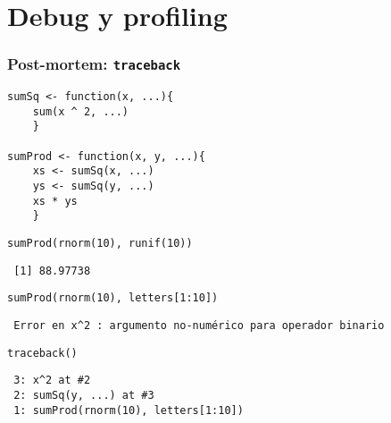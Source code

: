\documentclass[xcolor={usenames,svgnames,dvipsnames}]{beamer}
\begin{document}
\section{Debug y profiling}
\label{sec-3}
\begin{frame}[fragile]
\frametitle{Post-mortem: \texttt{traceback}}
\label{sec-3-1}


\lstset{language=R}
\begin{lstlisting}
sumSq <- function(x, ...){
    sum(x ^ 2, ...)
    }

sumProd <- function(x, y, ...){
    xs <- sumSq(x, ...)
    ys <- sumSq(y, ...)
    xs * ys
    }
\end{lstlisting}



\lstset{language=R}
\begin{lstlisting}
sumProd(rnorm(10), runif(10))
\end{lstlisting}

\begin{verbatim}
 [1] 88.97738
\end{verbatim}


\lstset{language=R}
\begin{lstlisting}
sumProd(rnorm(10), letters[1:10])
\end{lstlisting}

\begin{verbatim}
 Error en x^2 : argumento no-numérico para operador binario
\end{verbatim}


\lstset{language=R}
\begin{lstlisting}
traceback()
\end{lstlisting}

\begin{verbatim}
 3: x^2 at #2
 2: sumSq(y, ...) at #3
 1: sumProd(rnorm(10), letters[1:10])
\end{verbatim}
\end{frame}
\end{document}
